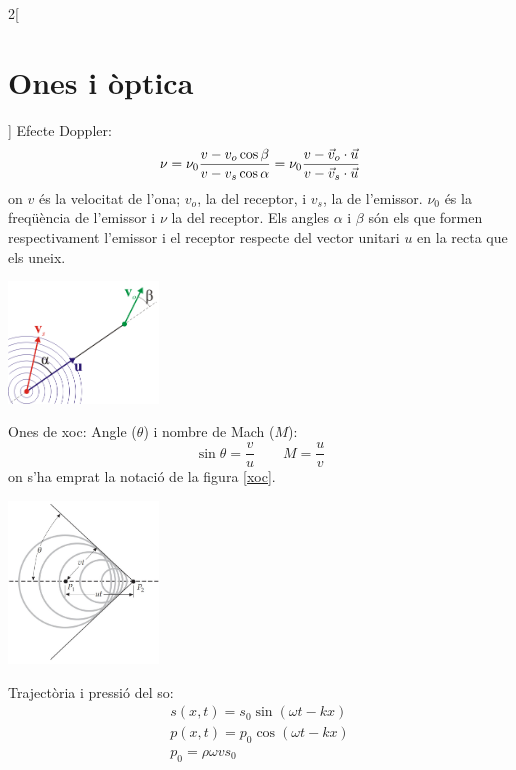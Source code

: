 \documentclass[class=article,10pt,crop=false]{standalone}
\begin{document}
\begin{multicols}{2}[\section{Ones i òptica}]
Efecte Doppler:
\begin{equation*}
    \nu=\nu_0\frac{v-v_o\cos\beta}{v- v_s\cos\alpha}=\nu_0\frac{v-\Vec{v}_o\cdot\Vec{u}}{v- \Vec{v}_s\cdot\Vec{u}}\\
\end{equation*}
{\footnotesize on $v$ és la velocitat de l'ona; $v_o$, la del receptor, i $v_s$, la de l'emissor. $\nu_0$ és la freqüència de l'emissor i $\nu$ la del receptor. Els angles $\alpha$ i $\beta$ són els que formen respectivament l'emissor i el receptor respecte del vector unitari $u$ en la recta que els uneix.}\newline
\begin{minipage}{\linewidth}
   \centering
   \includegraphics[width=4cm]{Physics/1st/Waves_and_optics/Images/dopp.png}
   \label{dopp}
\end{minipage}
Ones de xoc:
Angle ($\theta$) i nombre de Mach ($M$): $$\sin\theta=\frac{v}{u}\qquad M=\frac{u}{v}$$ {\footnotesize on s'ha emprat la notació de la figura \ref{xoc}.}\newline
\begin{minipage}{\linewidth}
   \centering
   \includegraphics[width=4cm]{Physics/1st/Waves_and_optics/Images/onesdexoc.jpg}
   \label{xoc}
\end{minipage}
Trajectòria i pressió del so:
\begin{gather*}
    s(x,t)=s_0\sin\left(\omega t-kx\right)\\
    p(x,t)=p_0\cos\left(\omega t-kx\right)\\
    p_0=\rho\omega vs_0

\end{gather*}
\end{multicols}
\end{document}
